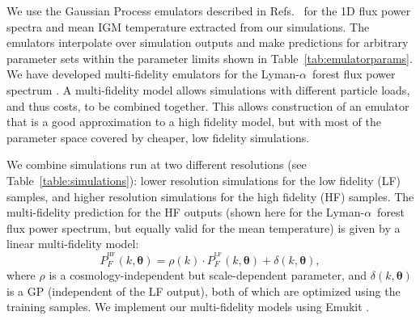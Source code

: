 \documentclass[a4paper,11pt]{article}
\newcommand{\lya}{Lyman-$\alpha$\ }
\begin{document}
We use the Gaussian Process emulators described in Refs.~\cite{2022MNRAS.517.3200F, 2023simsuite} for the 1D flux power spectra and mean IGM temperature extracted from our simulations. The emulators interpolate over simulation outputs and make predictions for arbitrary parameter sets within the parameter limits shown in Table~\ref{tab:emulatorparams}. We have developed multi-fidelity emulators for the \lya forest flux power spectrum \cite{2022MNRAS.517.3200F}.
A multi-fidelity model allows simulations with different particle loads, and thus costs, to be combined together.
This allows construction of an emulator that is a good approximation to a high fidelity model, but with most of the parameter space covered by cheaper, low fidelity simulations.

We combine simulations run at two different resolutions (see Table~\ref{table:simulations}): lower resolution simulations for the low fidelity (LF) samples, and higher resolution simulations for the high fidelity (HF) samples.
The multi-fidelity prediction for the HF outputs (shown here for the \lya forest flux power spectrum, but equally valid for the mean temperature) is given by a linear multi-fidelity model:
\begin{equation}
    P_F^{^\mathrm{HF}}(k, \boldsymbol{\theta}) = \rho(k) \cdot P_F^{^\mathrm{LF}}(k, \boldsymbol{\theta}) + \delta(k, \boldsymbol{\theta}),
    \label{eq:ko_model}
\end{equation}
where $\rho$ is a cosmology-independent but scale-dependent parameter, and $\delta(k, \boldsymbol{\theta})$ is a GP (independent of the LF output), both of which are optimized using the training samples.
We implement our multi-fidelity models using Emukit \cite{2021arXiv211013293P}.
\end{document}
